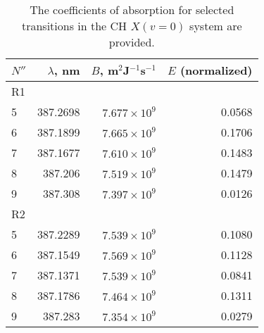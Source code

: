 \begin{table}
  \caption[Einstein B coefficients]{The coefficients of absorption for selected transitions in the CH \(X(v=0)\) system are provided.}
  \begin{center}
    \begin{tabular}{lrrr}
      \(N''\) & \(\lambda\), nm & \(B\), m\(^2\)J\(^{-1}\)s\(^{-1}\) & \(E\) (normalized) \tabularnewline
      \hline\hline
      R1 & & & \tabularnewline
      5 & 387.2698 & \(7.677 \times 10^9\) & 0.0568 \tabularnewline
      6 & 387.1899 & \(7.665 \times 10^9\) & 0.1706 \tabularnewline
      7 & 387.1677 & \(7.610 \times 10^9\) & 0.1483 \tabularnewline
      8 & 387.206  & \(7.519 \times 10^9\) & 0.1479 \tabularnewline
      9 & 387.308  & \(7.397 \times 10^9\) & 0.0126 \tabularnewline
      R2 & & & \tabularnewline
      5 & 387.2289 & \(7.539 \times 10^9\) & 0.1080 \tabularnewline
      6 & 387.1549 & \(7.569 \times 10^9\) & 0.1128 \tabularnewline
      7 & 387.1371 & \(7.539 \times 10^9\) & 0.0841 \tabularnewline
      8 & 387.1786 & \(7.464 \times 10^9\) & 0.1311 \tabularnewline
      9 & 387.283  & \(7.354 \times 10^9\) & 0.0279 \tabularnewline
    \end{tabular}
  \end{center}
  \label{tab:absorptionCoefficients}
\end{table}
